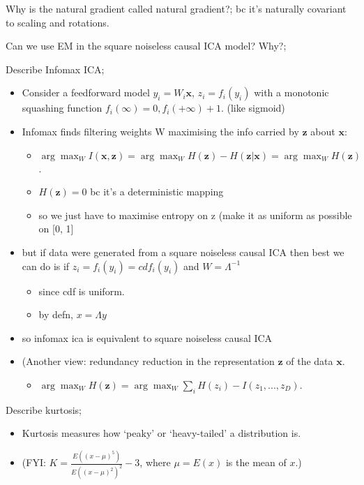 \documentclass{article}
\begin{document}
Why is the natural gradient called natural gradient?; bc it's naturally covariant to scaling and rotations.


Can we use EM in the square noiseless causal ICA model? Why?; 

Describe Infomax ICA; \begin{itemize}
    \item Consider a feedforward model $y_i=W_i\mathbf{x}$, $z_i=f_i(y_i)$
    with a monotonic squashing function $f_i(\infty)=0, f_i(+\infty)+1$. (like sigmoid)
    \item Infomax finds filtering weights W maximising the info carried by $\mathbf{z}$ about $\mathbf{x}$: \begin{itemize}
        \item $\arg\max_W I(\mathbf{x, z}) = \arg\max_W H(\mathbf{z})-H(\mathbf{z|x})=\arg\max_WH(\mathbf{z})$.
        \item $H(\mathbf{z})=0$ bc it's a deterministic mapping
        \item so we just have to maximise entropy on z (make it as uniform as possible on [0, 1]
    \end{itemize}
    \item but if data were generated from a square noiseless causal ICA then best we can do is if $z_i=f_i(y_i)=cdf_i(y_i)$ and $W=\Lambda^{-1}$
    \begin{itemize}
        \item since cdf is uniform.
        \item by defn, $x=\Lambda y$
    \end{itemize}
    \item so infomax ica is equivalent to square noiseless causal ICA
    \item (Another view: redundancy reduction in the representation $\mathbf{z}$ of the data $\mathbf{x}$.
    \begin{itemize}
        \item $\arg\max_W H(\mathbf{z})=\arg\max_W\sum_i H(z_i)-I(z_1,...,z_D)$.
    \end{itemize}
\end{itemize}

Describe kurtosis; \begin{itemize}
    \item Kurtosis measures how `peaky' or `heavy-tailed' a distribution is.
    \item (FYI: $K=\frac{E((x-\mu)^5)}{E((x-\mu)^2)^2}-3$, where $\mu=E(x)$ is the mean of $x$.)
\end{itemize}
\end{document}
